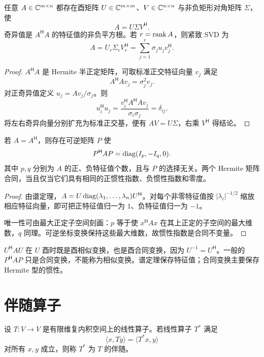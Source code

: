 \begin{theorem}[复矩阵的奇异值分解]
任意 $A\in\mathbb{C}^{m\times n}$ 都存在酉矩阵
$U\in\mathbb{C}^{m\times m}$、$V\in\mathbb{C}^{n\times n}$ 与非负矩形对角矩阵
$\Sigma$，使
\[
A=U\Sigma V^{\mathsf H}.
\]
奇异值是 $A^{\mathsf H}A$ 的特征值的非负平方根。若
$r=\operatorname{rank} A$，则紧致 SVD 为
\[
A=U_r\Sigma_rV_r^{\mathsf H}
=\sum_{j=1}^r\sigma_ju_jv_j^{\mathsf H}.
\]
\end{theorem}
\begin{proof}
$A^{\mathsf H}A$ 是 Hermite 半正定矩阵，可取标准正交特征向量
$v_j$ 满足
\[
A^{\mathsf H}Av_j=\sigma_j^2v_j.
\]
对正奇异值定义 $u_j=Av_j/\sigma_j$。则
\[
u_i^{\mathsf H}u_j
=\frac{v_i^{\mathsf H}A^{\mathsf H}Av_j}{\sigma_i\sigma_j}
=\delta_{ij}.
\]
将左右奇异向量分别扩充为标准正交基，便有 $AV=U\Sigma$，右乘
$V^{\mathsf H}$ 得结论。
\end{proof}

\begin{theorem}
若 $A=A^{\mathsf H}$，则存在可逆矩阵 $P$ 使
\[
P^{\mathsf H}AP=\operatorname{diag}(I_p,-I_q,0).
\]
其中 $p,q$ 分别为 $A$ 的正、负特征值个数，且与 $P$ 的选择无关。两个 Hermite 矩阵合同，当且仅当它们具有相同的正惯性指数、负惯性指数和零度。
\end{theorem}
\begin{proof}
由谱定理，$A=U\operatorname{diag}(\lambda_1,\ldots,\lambda_n)U^{\mathsf H}$。对每个非零特征值按
$|\lambda_i|^{-1/2}$ 缩放相应特征向量，即可把正特征值归一为 $1$、负特征值归一为 $-1$。

唯一性可由最大正定子空间刻画：$p$ 等于使 $x^{\mathsf H}Ax$ 在其上正定的子空间的最大维数，$q$ 同理。可逆坐标变换保持这些最大维数，故惯性指数是合同不变量。
\end{proof}

\begin{pitfall}[相似、合同与酉相似]
$U^{\mathsf H}AU$ 在 $U$ 酉时既是酉相似变换，也是酉合同变换，因为
$U^{-1}=U^{\mathsf H}$。一般的 $P^{\mathsf H}AP$ 只是合同变换，不能称为相似变换。谱定理保存特征值；合同变换主要保存 Hermite 型的惯性。
\end{pitfall}

\section{伴随算子}

\begin{definition}[伴随算子]
设 $T:V\to V$ 是有限维复内积空间上的线性算子。若线性算子 $T^*$ 满足
\[
\langle x,Ty\rangle=\langle T^*x,y\rangle
\]
对所有 $x,y$ 成立，则称 $T^*$ 为 $T$ 的伴随。
\end{definition}

